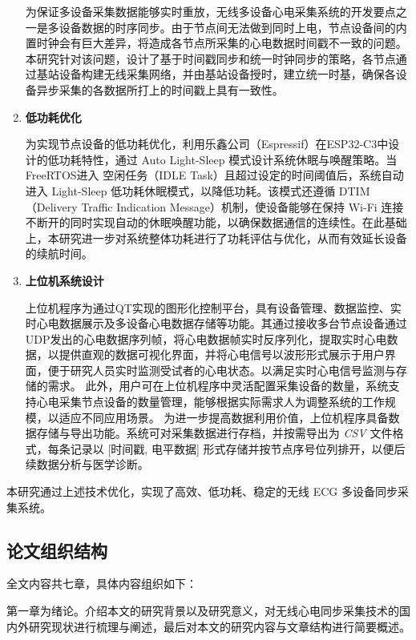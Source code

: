 \begin{enumerate}
    为保证多设备采集数据能够实时重放，无线多设备心电采集系统的开发要点之一是多设备数据的时序同步。由于节点间无法做到同时上电，节点设备间的内置时钟会有巨大差异，将造成各节点所采集的心电数据时间戳不一致的问题。本研究针对该问题，设计了基于时间戳同步和统一时钟同步的策略，各节点通过基站设备构建无线采集网络，并由基站设备授时，建立统一时基，确保各设备异步采集的各数据所打上的时间戳上具有一致性。

    \item \textbf{低功耗优化}  
    
    为实现节点设备的低功耗优化，利用乐鑫公司（Espressif）在ESP32-C3中设计的低功耗特性，通过 Auto Light-Sleep 模式设计系统休眠与唤醒策略。当FreeRTOS进入 空闲任务（IDLE Task）且超过设定的时间阈值后，系统自动进入 Light-Sleep 低功耗休眠模式，以降低功耗。该模式还遵循 DTIM（Delivery Traffic Indication Message）机制，使设备能够在保持 Wi-Fi 连接不断开的同时实现自动的休眠唤醒功能，以确保数据通信的连续性。在此基础上，本研究进一步对系统整体功耗进行了功耗评估与优化，从而有效延长设备的续航时间。

    \item \textbf{上位机系统设计}  
    
    上位机程序为通过QT实现的图形化控制平台，具有设备管理、数据监控、实时心电数据展示及多设备心电数据存储等功能。其通过接收多台节点设备通过UDP发出的心电数据序列帧，将心电数据帧实时反序列化，提取实时心电数据，以提供直观的数据可视化界面，并将心电信号以波形形式展示于用户界面，便于研究人员实时监测受试者的心电状态。以满足实时心电信号监测与存储的需求。
    此外，用户可在上位机程序中灵活配置采集设备的数量，系统支持心电采集节点设备的数量管理，能够根据实际需求人为调整系统的工作规模，以适应不同应用场景。
    为进一步提高数据利用价值，上位机程序具备数据存储与导出功能。系统可对采集数据进行存档，并按需导出为 \textit{CSV} 文件格式，每条记录以 [时间戳, 电平数据] 形式存储并按节点序号位列排开，以便后续数据分析与医学诊断。
    
\end{enumerate}
本研究通过上述技术优化，实现了高效、低功耗、稳定的无线 ECG 多设备同步采集系统。

\subsection{论文组织结构}

全文内容共七章，具体内容组织如下：

第一章为绪论。介绍本文的研究背景以及研究意义，对无线心电同步采集技术的国内外研究现状进行梳理与阐述，最后对本文的研究内容与文章结构进行简要概述。


